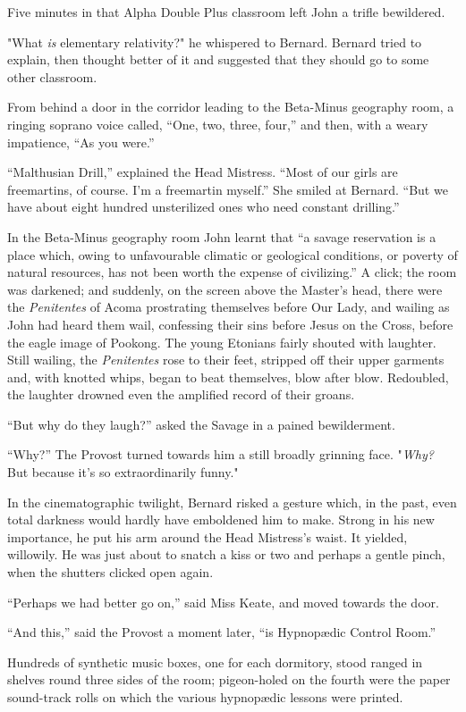 \documentclass[12pt]{report}
\begin{document}
Five minutes in that Alpha Double Plus classroom left John a trifle
bewildered.

"What \emph{is} elementary relativity?" he whispered to Bernard. Bernard
tried to explain, then thought better of it and suggested that they
should go to some other classroom.

From behind a door in the corridor leading to the Beta-Minus geography
room, a ringing soprano voice called, ``One, two, three, four,'' and
then, with a weary impatience, ``As you were.''

``Malthusian Drill,'' explained the Head Mistress. ``Most of our girls
are freemartins, of course. I'm a freemartin myself.'' She smiled at
Bernard. ``But we have about eight hundred unsterilized ones who need
constant drilling.''

In the Beta-Minus geography room John learnt that ``a savage reservation
is a place which, owing to unfavourable climatic or geological
conditions, or poverty of natural resources, has not been worth the
expense of civilizing.'' A click; the room was darkened; and suddenly,
on the screen above the Master's head, there were the \emph{Penitentes}
of Acoma prostrating themselves before Our Lady, and wailing as John had
heard them wail, confessing their sins before Jesus on the Cross, before
the eagle image of Pookong. The young Etonians fairly shouted with
laughter. Still wailing, the \emph{Penitentes} rose to their feet,
stripped off their upper garments and, with knotted whips, began to beat
themselves, blow after blow. Redoubled, the laughter drowned even the
amplified record of their groans.

``But why do they laugh?'' asked the Savage in a pained bewilderment.

``Why?'' The Provost turned towards him a still broadly grinning face.
"\emph{Why?} But because it's so extraordinarily funny."

In the cinematographic twilight, Bernard risked a gesture which, in the
past, even total darkness would hardly have emboldened him to make.
Strong in his new importance, he put his arm around the Head Mistress's
waist. It yielded, willowily. He was just about to snatch a kiss or two
and perhaps a gentle pinch, when the shutters clicked open again.

``Perhaps we had better go on,'' said Miss Keate, and moved towards the
door.

``And this,'' said the Provost a moment later, ``is Hypnopædic Control
Room.''

Hundreds of synthetic music boxes, one for each dormitory, stood ranged
in shelves round three sides of the room; pigeon-holed on the fourth
were the paper sound-track rolls on which the various hypnopædic lessons
were printed.
\end{document}
